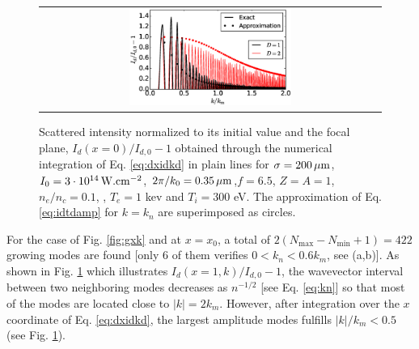 \documentclass[
 reprint,
 amsmath,amssymb,
 aps,
]{revtex4-1}
\begin{document}
\begin{figure}[!]
\begin{tabular}{c}
\includegraphics[width=0.49\textwidth]{Idk.eps}
\end{tabular}
\caption{ \label{fig:idk}
Scattered intensity normalized to its initial value and the focal plane, $I_d(x=0)/I_{d,0}-1$ obtained through the numerical integration of Eq. \eqref{eq:dxidkd} in plain lines for 
$\sigma =200\,\rm\mu m$, $I_0=3\cdot 10^{14} \,\rm W.cm^{-2}$, $2\pi/k_0 = 0.35\,\rm\mu m$,$f = 6.5$, $Z=A=1$, $n_e/n_c=0.1$, , $T_e=1$ kev and $T_i=300$ eV. The approximation of Eq. \eqref{eq:idtdamp} for $k=k_n$ are superimposed  as circles.
 }
\end{figure}
For the case of Fig. \ref{fig:gxk} and  at $x=x_0$, a total of $2(N_\mathrm{max}-N_\mathrm{min}+1) = 422$ growing modes are  found [only 6 of them verifies $0<k_n<0.6k_m$, see (a,b)]. As shown in  Fig. \ref{fig:idk} which illustrates $I_d(x=1, k)/I_{d,0}-1$, the wavevector interval between two neighboring modes decreases as $n^{-1/2}$ [see Eq. \eqref{eq:kn}] so that  most of the modes are located close to $\vert k \vert = 2k_m$. However, after integration over the $x$ coordinate  of Eq. \eqref{eq:dxidkd}, the largest amplitude modes fulfills $\vert k \vert /k_m<0.5$ (see Fig. \ref{fig:idk}).
\end{document}

